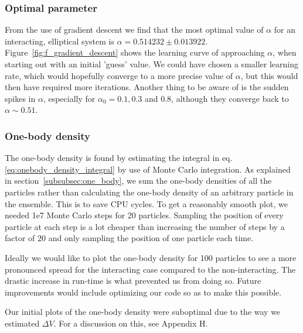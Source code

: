 \documentclass[
    a4paper, aps, twocolumn, floatfix, superscriptaddress,
    nofootinbib]{revtex4-1}
\begin{document}
\subsubsection{Optimal parameter}
From the use of gradient descent we find that the most optimal value of $\alpha$ for an interacting, elliptical system is $\alpha = 0.514232\pm 0.013922$. Figure~\ref{fig:f_gradient_descent} shows the learning curve of approaching $\alpha$, when starting out with an initial 'guess' value. We could have chosen a smaller learning rate, which would hopefully converge to a more precise value of $\alpha$, but this would then have required more iterations. Another thing to be aware of is the sudden spikes in $\alpha$, especially for $\alpha_0 = 0.1, 0.3$ and 0.8, although they converge back to $\alpha \sim 0.51$.

\subsubsection{One-body density}
The one-body density is found by estimating the integral in eq. \eqref{eq:onebody_density_integral} by use of Monte Carlo integration. As explained in section~\ref{subsubsec:one_body}, we sum the one-body densities of all the particles rather than calculating the one-body density of an arbitrary particle in the ensemble. This is to save CPU cycles. To get a reasonably smooth plot, we needed 1e7 Monte Carlo steps for 20 particles. Sampling the position of every particle at each step is a lot cheaper than increasing the number of steps by a factor of $20$ and only sampling the position of one particle each time.

Ideally we would like to plot the one-body density for 100 particles to see a more pronounced spread for the interacting case compared to the non-interacting. The drastic increase in run-time is what prevented us from doing so. Future improvements would include optimizing our code so as to make this possible. 

Our initial plots of the one-body density were suboptimal due to the way we estimated $\Delta V$. For a discussion on this, see Appendix H.


\end{document}
